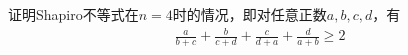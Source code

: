 \begin{question}
  证明Shapiro不等式在$n=4$时的情况，即对任意正数$a,b,c,d$，有
  \begin{align*}
    \frac{a}{b+c}+\frac{b}{c+d}+\frac{c}{d+a}+\frac{d}{a+b}\ge 2
  \end{align*}
\end{question}


